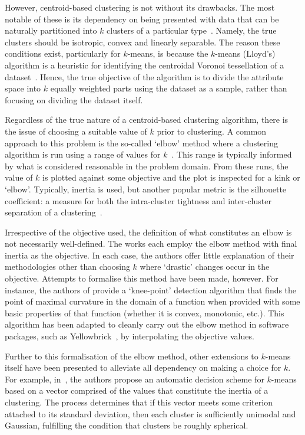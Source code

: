 However, centroid-based clustering is not without its drawbacks. The most
notable of these is its dependency on being presented with data that can be
naturally partitioned into \(k\) clusters of a particular
type~\cite{Ostrovsky2013}. Namely, the true clusters should be isotropic, convex
and linearly separable. The reason these conditions exist, particularly for
\(k\)-means, is because the \(k\)-means (Lloyd's) algorithm is a heuristic for
identifying the centroidal Voronoi tessellation of a dataset~\cite{Du2006}.
Hence, the true objective of the algorithm is to divide the attribute space into
\(k\) equally weighted parts using the dataset as a sample, rather than focusing
on dividing the dataset itself.

Regardless of the true nature of a centroid-based clustering algorithm, there is
the issue of choosing a suitable value of \(k\) prior to clustering. A common
approach to this problem is the so-called `elbow' method where a clustering
algorithm is run using a range of values for \(k\)~\cite{Aggarwal2013}. This
range is typically informed by what is considered reasonable in the problem
domain. From these runs, the value of \(k\) is plotted against some objective
and the plot is inspected for a kink or `elbow'. Typically, inertia is used, but
another popular metric is the silhouette coefficient: a measure for both the
intra-cluster tightness and inter-cluster separation of a
clustering~\cite{Rousseeuw1987}.

Irrespective of the objective used, the definition of what constitutes an elbow
is not necessarily well-defined. The works \cite{Sujatha2013,Syakur2018} each
employ the elbow method with final inertia as the objective. In each case, the
authors offer little explanation of their methodologies other than choosing
\(k\) where `drastic' changes occur in the objective. Attempts to formalise this
method have been made, however. For instance, the authors of \cite{Satopaa2011}
provide a `knee-point' detection algorithm that finds the point of maximal
curvature in the domain of a function when provided with some basic properties
of that function (whether it is convex, monotonic, etc.). This algorithm has
been adapted to cleanly carry out the elbow method in software packages, such as
Yellowbrick~\cite{Bengfort2019}, by interpolating the objective values.

Further to this formalisation of the elbow method, other extensions to
\(k\)-means itself have been presented to alleviate all dependency on making a
choice for \(k\). For example, in~\cite{Olukanmi2019}, the authors propose an
automatic decision scheme for \(k\)-means based on a vector comprised of the
values that constitute the inertia of a clustering. The process determines that
if this vector meets some criterion attached to its standard deviation, then
each cluster is sufficiently unimodal and Gaussian, fulfilling the condition
that clusters be roughly spherical.

